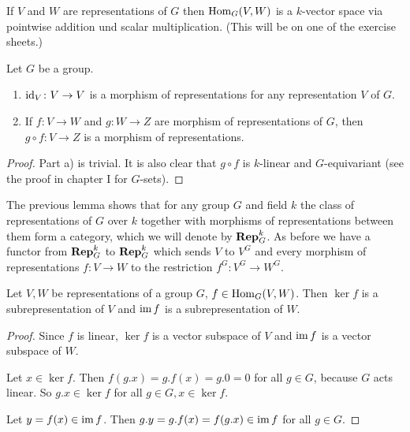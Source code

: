 \begin{rem}
  If $V$ and $W$ are representations of $G$ then $\operatorname{Hom}_G(V,W)$ is a $k$-vector space via pointwise addition und scalar multiplication. (This will be on one of the exercise sheets.)
\end{rem}


\begin{lem}\label{lem: composition of morphisms of representations}
  Let $G$ be a group.
  \begin{enumerate}[label=\emph{\alph*)},leftmargin=*]
    \item
      $\operatorname{id}_V \colon V \to V$ is a morphism of representations for any representation $V$ of $G$.
    \item
      If $f \colon V \to W$  and $g \colon W \to Z$ are morphism of representations of $G$, then $g \circ f \colon V \to Z$ is a morphism of representations.
  \end{enumerate}
\end{lem}
\begin{proof}
  Part a) is trivial. It is also clear that $g \circ f$ is $k$-linear and $G$-equivariant (see the proof in chapter I for $G$-sets).
\end{proof}


The previous lemma shows that for any group $G$ and field $k$ the class of representations of $G$ over $k$ together with morphisms of representations between them form a category, which we will denote by $\mathbf{Rep}^k_G$. As before we have a functor from $\mathbf{Rep}^k_G$ to $\mathbf{Rep}^k_G$ which sends $V$ to $V^G$ and every morphism of representations $f \colon V \to W$ to the restriction $f^G \colon V^G \to W^G$.


\begin{lem}\label{lem: ker and im subrepresentations}
  Let $V,W$ be representations of a group $G$, $f \in \operatorname{Hom}_G(V,W)$. Then $\ker f$ is a subrepresentation of $V$ and $\operatorname{im} f$ is a subrepresentation of $W$.
\end{lem}
\begin{proof}
  Since $f$ is linear, $\ker f$ is a vector subspace of $V$ and $\operatorname{im} f$ is a vector subspace of $W$.
  
  Let $x \in \ker f$. Then $f(g.x) = g.f(x) = g.0 = 0$ for all $g \in G$, because $G$ acts linear. So $g.x \in \ker f$ for all $g \in G, x \in \ker f$.
  
  Let $y = f(x) \in \operatorname{im} f$. Then $g.y = g.f(x) = f(g.x) \in \operatorname{im} f$ for all $g \in G$.
\end{proof}



